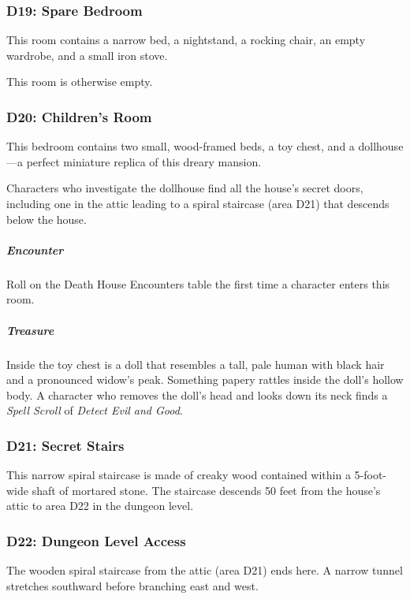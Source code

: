 \documentclass[10pt,a4paper,twoside,bg=print,twocolumn,openany,nodeprecatedcode]{dndbook}
\begin{document}
\subsubsection{D19: Spare Bedroom}
\begin{DndReadAloud}{}
This room contains a narrow bed, a nightstand, a rocking chair, an empty wardrobe, and a small iron stove.

\end{DndReadAloud}

This room is otherwise empty.

\subsubsection{D20: Children's Room}
\begin{DndReadAloud}{}
This bedroom contains two small, wood-framed beds, a toy chest, and a dollhouse—a perfect miniature replica of this dreary mansion.

\end{DndReadAloud}

Characters who investigate the dollhouse find all the house's secret doors, including one in the attic leading to a spiral staircase (area D21) that descends below the house.

\subparagraph{Encounter}
Roll on the Death House Encounters table the first time a character enters this room.

\subparagraph{Treasure}
Inside the toy chest is a doll that resembles a tall, pale human with black hair and a pronounced widow's peak. Something papery rattles inside the doll's hollow body. A character who removes the doll's head and looks down its neck finds a \textit{Spell Scroll} of \textit{Detect Evil and Good}.

\subsubsection{D21: Secret Stairs}
This narrow spiral staircase is made of creaky wood contained within a 5-foot-wide shaft of mortared stone. The staircase descends 50 feet from the house's attic to area D22 in the dungeon level.

\subsubsection{D22: Dungeon Level Access}
The wooden spiral staircase from the attic (area D21) ends here. A narrow tunnel stretches southward before branching east and west.
\end{document}
